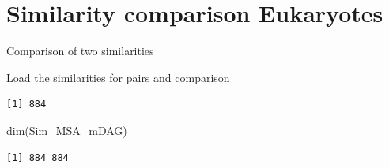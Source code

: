 \documentclass[
  letterpaper,
  DIV=11,
  numbers=noendperiod]{scrreprt}
\newenvironment{Shaded}{}{}
\newcommand{\DecValTok}[1]{\textcolor[rgb]{0.82,0.60,0.40}{#1}}
\newcommand{\FunctionTok}[1]{\textcolor[rgb]{0.38,0.69,0.94}{#1}}
\newcommand{\NormalTok}[1]{\textcolor[rgb]{0.67,0.70,0.75}{#1}}
\newcommand{\OtherTok}[1]{\textcolor[rgb]{0.15,0.68,0.38}{#1}}
\newcommand{\SpecialCharTok}[1]{\textcolor[rgb]{0.34,0.71,0.76}{#1}}
\begin{document}
\hypertarget{similarity-comparison-eukaryotes}{%
\section{Similarity comparison
Eukaryotes}\label{similarity-comparison-eukaryotes}}

Comparison of two similarities

Load the similarities for pairs and comparison

\begin{Shaded}
\end{Shaded}

\begin{verbatim}
[1] 884
\end{verbatim}

\begin{Shaded}
\begin{Highlighting}[]
\FunctionTok{dim}\NormalTok{(Sim\_MSA\_mDAG)}
\end{Highlighting}
\end{Shaded}

\begin{verbatim}
[1] 884 884
\end{verbatim}
\end{document}

